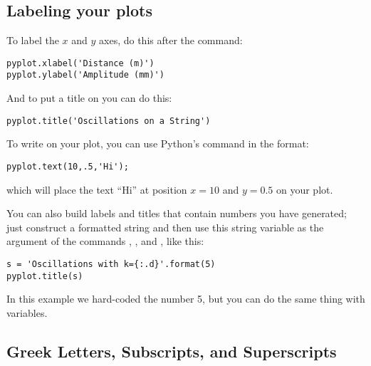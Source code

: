 \subsection*{Labeling your plots}
To label the $x$ and $y$ axes, do this after the  command:
\begin{Verbatim}
pyplot.xlabel('Distance (m)')
pyplot.ylabel('Amplitude (mm)')
\end{Verbatim}
And to put a title on you can do this:
\begin{Verbatim}
pyplot.title('Oscillations on a String')
\end{Verbatim}
  To write on your
plot, you can use Python's  command in the format:
\begin{Verbatim}
pyplot.text(10,.5,'Hi');
\end{Verbatim}
which will place the text ``Hi'' at position $x=10$ and $y=0.5$ on
your plot.

You can also build labels and titles that contain numbers you have
generated; just construct a formatted string and then use this string
variable as the argument of the commands , ,
and , like this:
\begin{Verbatim}
s = 'Oscillations with k={:.d}'.format(5)
pyplot.title(s)
\end{Verbatim}
In this example we hard-coded the number 5, but you can do the same
thing with variables.


\subsection*{Greek Letters, Subscripts, and Superscripts}


